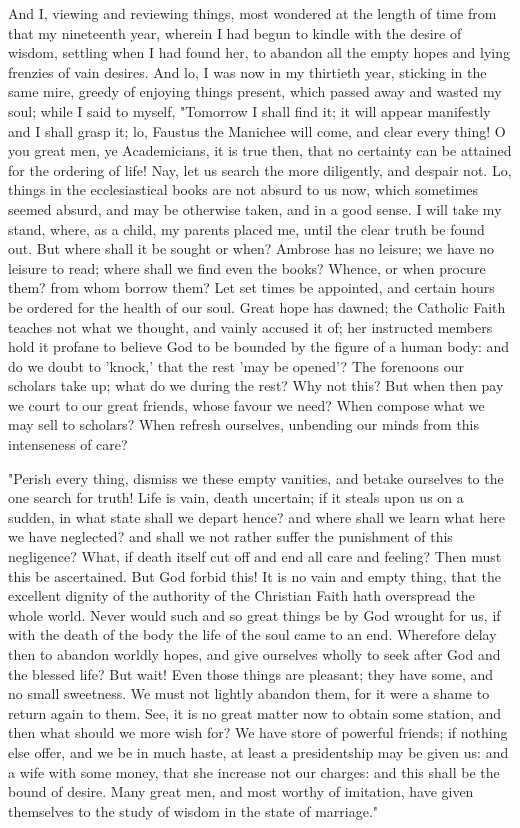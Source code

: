 \documentclass[b5paper,openright,12pt,twoside]{book}
\begin{document}
And I, viewing and reviewing things, most wondered at the length of time
from that my nineteenth year, wherein I had begun to kindle with the
desire of wisdom, settling when I had found her, to abandon all the
empty hopes and lying frenzies of vain desires. And lo, I was now in
my thirtieth year, sticking in the same mire, greedy of enjoying things
present, which passed away and wasted my soul; while I said to myself,
"Tomorrow I shall find it; it will appear manifestly and I shall grasp
it; lo, Faustus the Manichee will come, and clear every thing! O you
great men, ye Academicians, it is true then, that no certainty can
be attained for the ordering of life! Nay, let us search the more
diligently, and despair not. Lo, things in the ecclesiastical books
are not absurd to us now, which sometimes seemed absurd, and may be
otherwise taken, and in a good sense. I will take my stand, where, as
a child, my parents placed me, until the clear truth be found out. But
where shall it be sought or when? Ambrose has no leisure; we have no
leisure to read; where shall we find even the books? Whence, or when
procure them? from whom borrow them? Let set times be appointed, and
certain hours be ordered for the health of our soul. Great hope has
dawned; the Catholic Faith teaches not what we thought, and vainly
accused it of; her instructed members hold it profane to believe God to
be bounded by the figure of a human body: and do we doubt to 'knock,'
that the rest 'may be opened'? The forenoons our scholars take up; what
do we during the rest? Why not this? But when then pay we court to our
great friends, whose favour we need? When compose what we may sell
to scholars? When refresh ourselves, unbending our minds from this
intenseness of care?

"Perish every thing, dismiss we these empty vanities, and betake
ourselves to the one search for truth! Life is vain, death uncertain; if
it steals upon us on a sudden, in what state shall we depart hence?
and where shall we learn what here we have neglected? and shall we not
rather suffer the punishment of this negligence? What, if death itself
cut off and end all care and feeling? Then must this be ascertained.
But God forbid this! It is no vain and empty thing, that the excellent
dignity of the authority of the Christian Faith hath overspread the
whole world. Never would such and so great things be by God wrought for
us, if with the death of the body the life of the soul came to an end.
Wherefore delay then to abandon worldly hopes, and give ourselves wholly
to seek after God and the blessed life? But wait! Even those things are
pleasant; they have some, and no small sweetness. We must not lightly
abandon them, for it were a shame to return again to them. See, it is
no great matter now to obtain some station, and then what should we more
wish for? We have store of powerful friends; if nothing else offer, and
we be in much haste, at least a presidentship may be given us: and a
wife with some money, that she increase not our charges: and this shall
be the bound of desire. Many great men, and most worthy of imitation,
have given themselves to the study of wisdom in the state of marriage."
\end{document}
